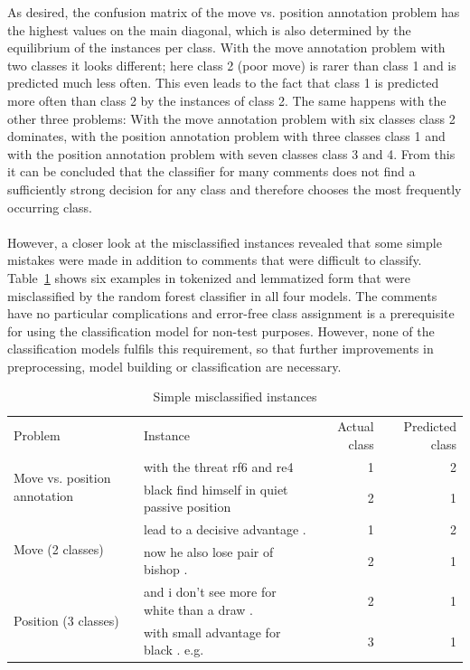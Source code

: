 \documentclass[article,type=msc,colorback,accentcolor=tud7b]{tudthesis}
\begin{document}
    As desired, the confusion matrix of the move vs. position annotation problem has the highest values on the main diagonal, which is also determined by the equilibrium of the instances per class. With the move annotation problem with two classes it looks different; here class 2 (poor move) is rarer than class 1 and is predicted much less often. This even leads to the fact that class 1 is predicted more often than class 2 by the instances of class 2. The same happens with the other three problems: With the move annotation problem with six classes class 2 dominates, with the position annotation problem with three classes class 1 and with the position annotation problem with seven classes class 3 and 4. From this it can be concluded that the classifier for many comments does not find a sufficiently strong decision for any class and therefore chooses the most frequently occurring class. \\\\
    However, a closer look at the misclassified instances revealed that some simple mistakes were made in addition to comments that were difficult to classify. Table~\ref{tab:misclassified_instances} shows six examples in tokenized and lemmatized form that were misclassified by the random forest classifier in all four models. The comments have no particular complications and error-free class assignment is a prerequisite for using the classification model for non-test purposes. However, none of the classification models fulfils this requirement, so that further improvements in preprocessing, model building or classification are necessary.

	\begin{table}[H]
      \begin{tabular}{| l | l | r | r |}
		\cline{1-4}
		Problem & Instance & Actual class & Predicted class \\ \cline{1-4}
		\multirow{2}{*}{Move vs. position annotation} & with the threat rf6 and re4 & 1 & 2 \\ \cline{2-4}
		 & black find himself in quiet passive position & 2 & 1 \\ \cline{1-4}
		\multirow{2}{*}{Move (2 classes)} & lead to a decisive advantage . & 1 & 2 \\ \cline{2-4}
		 & now he also lose pair of bishop . & 2 & 1 \\ \cline{1-4}
		\multirow{2}{*}{Position (3 classes)} & and i don't see more for white than a draw . & 2 & 1 \\ \cline{2-4}
		 & with small advantage for black . e.g. & 3 & 1 \\ \cline{1-4}
	  \end{tabular}
      \caption{Simple misclassified instances}
      \label{tab:misclassified_instances}
	\end{table}
\end{document}
